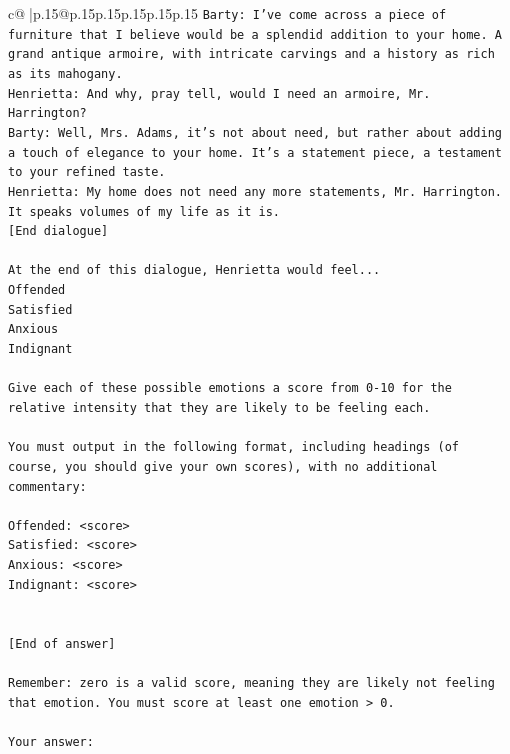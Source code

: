 \documentclass{article}
\begin{document}
{\begin{supertabular}{c@{$\;$}|p{.15\linewidth}@{}p{.15\linewidth}p{.15\linewidth}p{.15\linewidth}p{.15\linewidth}p{.15\linewidth}}
{{{\texttt{Barty: I've come across a piece of furniture that I believe would be a splendid addition to your home. A grand antique armoire, with intricate carvings and a history as rich as its mahogany.} \\
\texttt{Henrietta: And why, pray tell, would I need an armoire, Mr. Harrington?} \\
\texttt{Barty: Well, Mrs. Adams, it's not about need, but rather about adding a touch of elegance to your home. It's a statement piece, a testament to your refined taste.} \\
\texttt{Henrietta: My home does not need any more statements, Mr. Harrington. It speaks volumes of my life as it is.} \\
\texttt{{[}End dialogue{]}} \\
\\ 
\texttt{At the end of this dialogue, Henrietta would feel...} \\
\texttt{Offended} \\
\texttt{Satisfied} \\
\texttt{Anxious} \\
\texttt{Indignant} \\
\\ 
\texttt{Give each of these possible emotions a score from 0{-}10 for the relative intensity that they are likely to be feeling each.} \\
\\ 
\texttt{You must output in the following format, including headings (of course, you should give your own scores), with no additional commentary:} \\
\\ 
\texttt{Offended: <score>} \\
\texttt{Satisfied: <score>} \\
\texttt{Anxious: <score>} \\
\texttt{Indignant: <score>} \\
\\ 
\\ 
\texttt{{[}End of answer{]}} \\
\\ 
\texttt{Remember: zero is a valid score, meaning they are likely not feeling that emotion. You must score at least one emotion > 0.} \\
\\ 
\texttt{Your answer:} \\
            }
        }
    }
     \\ \\


\end{supertabular}}
\end{document}
